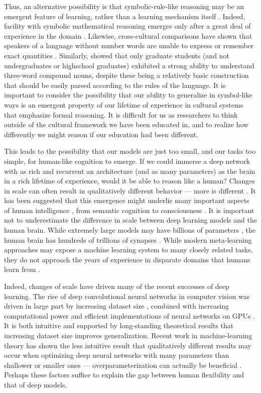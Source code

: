 Thus, an alternative possibility is that symbolic-rule-like reasoning may be an emergent feature of learning, rather than a learning mechanism itself \citep{McClelland1999, McClelland2002, McClelland2010a}. Indeed, facility with symbolic mathematical reasoning emerges only after a great deal of experience in the domain \citep{Burger1986, McClelland2016}. Likewise, cross-cultural comparisons have shown that speakers of a language without number words are unable to express or remember exact quantities \citep{Frank2008}. Similarly, \citet{Gleitman1970} showed that only graduate students (and not undergraduates or highschool graduates) exhibited a strong ability to understand three-word compound nouns, despite these being a relatively basic construction that should be easily parsed according to the rules of the language. It is important to consider the possibility that our ability to generalize in symbol-like ways is an emergent property of our lifetime of experience in cultural systems that emphasize formal reasoning. It is difficult for us as researchers to think outside of the cultural framework we have been educated in, and to realize how differently we might reason if our education had been different. \par 
This leads to the possibility that our models are just too small, and our tasks too simple, for human-like cognition to emerge. If we could immerse a deep network with as rich and recurrent an architecture (and as many parameters) as the brain in a rich lifetime of experience, would it be able to reason like a human? Changes in scale can often result in qualitatively different behavior --- more is different \citep{Anderson1972}. It has been suggested that this emergence might underlie many important aspects of human intelligence \citep{McClelland2010a}, from semantic cognition \citep{Rogers2008, Saxe2019} to consciousness \citep{Chalmers2006}. It is important not to underestimate the difference in scale between deep learning models and the human brain. While extremely large models may have billions of parameters \citep[][e.g.]{Radford2019}, the human brain has hundreds of trillions of synapses \citep{Drachman2005}. While modern meta-learning approaches may expose a machine learning system to many closely related tasks, they do not approach the years of experience in disparate domains that humans learn from \citep{Mitchell2018}.\par 
Indeed, changes of scale have driven many of the recent successes of deep learning. The rise of deep convolutional neural networks in computer vision was driven in large part by increasing dataset size \citep{Deng2009}, combined with increasing computational power and efficient implementations of neural networks on GPUs \citep{Krizhevsky2012}. It is both intuitive and supported by long-standing theoretical results \citep{Bartlett2002} that increasing dataset size improves generalization. Recent work in machine-learning theory has shown the less intuitive result that qualitatively different results may occur when optimizing deep neural networks with many parameters than shallower or smaller ones --- overparameterization can actually be beneficial \citep{Dauphin2014, Arora2018a}. Perhaps these factors suffice to explain the gap between human flexibility and that of deep models.\par 
